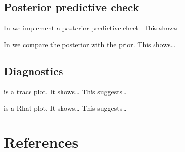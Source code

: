 \documentclass[
  letterpaper,
  DIV=11,
  numbers=noendperiod]{scrartcl}
\begin{document}
\hypertarget{posterior-predictive-check}{%
\subsection{Posterior predictive
check}\label{posterior-predictive-check}}

In we implement a posterior predictive check. This shows\ldots{}

In we compare the posterior with the prior. This shows\ldots{}

\hypertarget{diagnostics}{%
\subsection{Diagnostics}\label{diagnostics}}

is a trace plot. It shows\ldots{} This suggests\ldots{}

is a Rhat plot. It shows\ldots{} This suggests\ldots{}

\newpage

\hypertarget{references}{%
\section{References}\label{references}}
\end{document}
